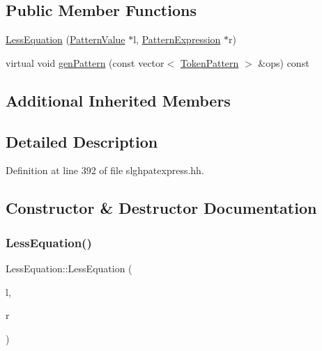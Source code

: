\subsection*{Public Member Functions}
\begin{DoxyCompactItemize}
\item 
\mbox{\hyperlink{class_less_equation_aca2fe588c84445e11e97754c85f5ffb1}{Less\+Equation}} (\mbox{\hyperlink{class_pattern_value}{Pattern\+Value}} $\ast$l, \mbox{\hyperlink{class_pattern_expression}{Pattern\+Expression}} $\ast$r)
\item 
virtual void \mbox{\hyperlink{class_less_equation_a6bc8fcb6385a1804b80b0329b26ef4b0}{gen\+Pattern}} (const vector$<$ \mbox{\hyperlink{class_token_pattern}{Token\+Pattern}} $>$ \&ops) const
\end{DoxyCompactItemize}
\subsection*{Additional Inherited Members}


\subsection{Detailed Description}


Definition at line 392 of file slghpatexpress.\+hh.



\subsection{Constructor \& Destructor Documentation}
\mbox{\label{class_less_equation_aca2fe588c84445e11e97754c85f5ffb1}} 
\subsubsection{\texorpdfstring{LessEquation()}{LessEquation()}}
{\footnotesize\ttfamily Less\+Equation\+::\+Less\+Equation (\begin{DoxyParamCaption}\item[{\mbox{\hyperlink{class_pattern_value}{Pattern\+Value}} $\ast$}]{l,  }\item[{\mbox{\hyperlink{class_pattern_expression}{Pattern\+Expression}} $\ast$}]{r }\end{DoxyParamCaption})\hspace{0.3cm}{\ttfamily [inline]}}



